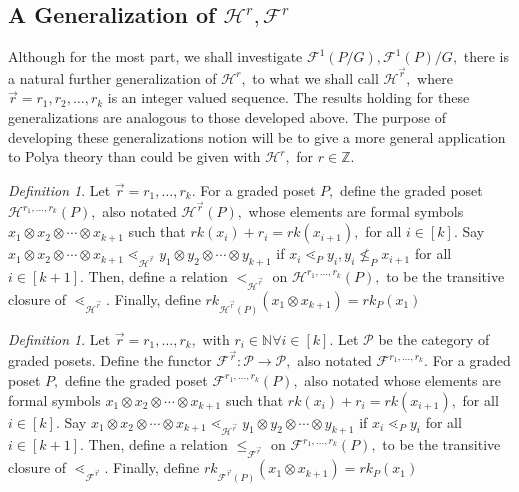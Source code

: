 \documentclass{amsart}
\theoremstyle{remark}
\newtheorem{defn}[thm]{Definition}
\newcommand\BN{{\mathbb N}}
\newcommand\BBZ{{\mathbb Z}}
\renewcommand{\vec}[1]{\overrightarrow{#1}}
\begin{document}
\subsection{A Generalization of $\mathcal H^r,\mathcal F^r$}
Although for the most part, we shall investigate $\mathcal F^1(P/G),\mathcal F^1(P)/G,$ there is a natural further generalization of $\mathcal H^r,$ to what we shall call $\mathcal H^{\vec r},$ where $\vec r = r_1,r_2,\ldots, r_k$ is an integer valued sequence. The results holding for these generalizations are analogous to those developed above. The purpose of developing these generalizations notion will be to give a more general application to Polya theory than could be given with $\mathcal H^r,$ for $r \in \BBZ$.

\begin{defn}
Let $\vec r = r_1,\ldots,r_k.$ For a graded poset $P,$ define the graded poset $\mathcal H^{r_1,\ldots, r_k}(P),$ also notated $\mathcal H^{\vec r}(P),$ whose elements are formal symbols $x_1 \otimes x_2 \otimes \cdots \otimes x_{k+1}$ such that $rk(x_i)+r_i = rk(x_{i+1}),$ for all $i \in [k].$ Say $x_1 \otimes x_2 \otimes \cdots \otimes x_{k+1}\lessdot_{\mathcal H^{\vec r}} y_1 \otimes y_2 \otimes \cdots \otimes y_{k+1}$ if $x_i \lessdot_P y_i,y_{i} \not \leq_P x_{i+1}$ for all $i \in [k+1].$ Then, define a relation $<_{\mathcal H^{\vec r}}$ on $\mathcal H^{r_1,\ldots, r_k}(P),$ to be the transitive closure of $\lessdot_{\mathcal H^{\vec r}}.$ Finally, define $rk_{\mathcal H^{\vec r}(P)}(x_1\otimes x_{k+1}) = rk_P(x_1)$
\end{defn}

\begin{defn}
Let $\vec r = r_1,\ldots,r_k,$ with $r_i \in \BN\forall i \in [k].$ Let $\mathcal P$ be the category of graded posets. Define the functor $\mathcal F^{\vec r}:\mathcal P \rightarrow \mathcal P,$ also notated $\mathcal F^{r_1,\ldots, r_k}.$ For a graded poset $P,$ define the graded poset $\mathcal F^{r_1,\ldots, r_k}(P),$ also notated whose elements are formal symbols $x_1 \otimes x_2 \otimes \cdots \otimes x_{k+1}$ such that $rk(x_i)+r_i = rk(x_{i+1}),$ for all $i \in [k].$ Say 
$x_1 \otimes x_2 \otimes \cdots \otimes x_{k+1}\lessdot_{\mathcal H^{\vec r}} y_1 \otimes y_2 \otimes \cdots \otimes y_{k+1}$ if $x_i \lessdot_P y_i$ for all $i \in [k+1]$. Then, define a relation $\leq_{\mathcal F^{\vec r}}$ on $\mathcal F^{r_1,\ldots, r_k}(P),$ to be the transitive closure of $\lessdot_{\mathcal F^{\vec r}}.$ Finally, define $rk_{\mathcal F^{\vec r}(P)}(x_1\otimes x_{k+1}) = rk_P(x_1)$
\end{defn}
\end{document}
